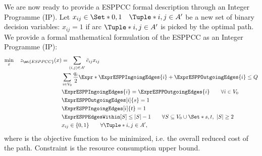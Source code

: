 \medskip

We are now ready to provide a ESPPCC formal description through an Integer Programme (IP).
Let $x_{ij} \in \Set*{0, 1} \quad \Tuple*{i, j} \in A^\prime$ be a new set of binary decision variables:
$x_{ij} = 1$ if arc $\Tuple*{i, j} \in A^\prime$ is picked by the optimal path.
We provide a formal mathematical formulation of the ESPPCC as an Integer Programme (IP):
\begin{align}
	\min_{x} \quad z_\mt{ESPPCC}(x) & =  \sum_{(i, j) \in A^\prime} \bar{c}_{ij} x_{ij}                                                     \label{eq:espprc-obj-function}                                                                \\
	                                & \sum_{i \in V_0} \frac{q_i}{2} \Expr*{ \ExprESPPIngoingEdges{i} + \ExprESPPOutgoingEdges{i} }  \le Q  \label{eq:espprc-resource-upper-bound-constraint}                                             \\
	                                & \ExprESPPIngoingEdges{i} = \ExprESPPOutgoingEdges{i}                                                  \qquad \forall i \in V_0          \label{eq:espprc-flow-conservation-constraint-customers}    \\
	                                & \ExprESPPOutgoingEdges[i]{s} = 1                                                                      \label{eq:espprc-source-emitting-flow}                                                        \\
	                                & \ExprESPPIngoingEdges[i]{t} = 1                                                                       \label{eq-espprc-sink-consuming-flow}                                                         \\
	                                & \ExprESPPEdgesWithin[S] \le |S| - 1                                                                   \qquad \forall S \subseteq V_0 \cup \Set*{s, t},\ |S| \ge 2 \label{eq:espprc-sec-constraints} \\
	                                & x_{ij}                   \in \lbrace 0, 1 \rbrace                                                     \qquad \forall \Tuple*{i, j} \in A^\prime    \label{eq:espprc-x-mip-var-bounds},
\end{align}
where  is the objective function to be minimized, i.e. the overall reduced cost of the path.
Constraint  is the resource consumption upper bound.

